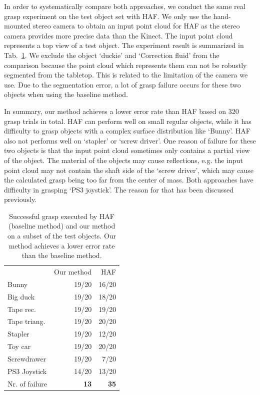 In order to systematically compare both approaches, we conduct the same real grasp experiment on the test object set with HAF. We only use the hand-mounted stereo camera to obtain an input point cloud for HAF as the stereo camera provides more precise data than the Kinect. The input point cloud represents a top view of a test object. The experiment result is summarized in Tab.~\ref{tab:baseline_compare}. 
We exclude the object `duckie' and `Correction fluid' from the comparison because the point cloud which represents them can not be robustly segmented from the tabletop. This is related to the limitation of the camera we use. Due to the segmentation error, a lot of grasp failure occurs for these two objects when using the baseline method. 

In summary, our method achieves a lower error rate than HAF based on 320 grasp trials in total. HAF can perform well on small regular objects, while it has difficulty to grasp objects with a complex surface distribution like `Bunny'. HAF also not performs well on `stapler' or `screw driver'. One reason of failure for these two objects is that the input point cloud sometimes only contains a partial view of the object. The material of the objects may cause reflections, e.g. the input point cloud may not contain the shaft side of the `screw driver', which may cause the calculated grasp being too far from the center of mass. Both approaches have difficulty in grasping `PS3 joystick'. The reason for that has been discussed previously.
\begin{table}[!htb]
\centering
\begin{tabular}{lrr}
               & Our method & HAF   \\
Bunny          & 19/20      & 16/20 \\
Big duck       & 19/20      & 18/20 \\
Tape rec.      & 19/20      & 19/20 \\
Tape triang.   & 19/20      & 20/20 \\
Stapler        & 19/20      & 12/20 \\
Toy car        & 19/20      & 20/20 \\
Screwdrawer    & 19/20      & 7/20  \\
PS3 Joystick   & 14/20      & 13/20 \\
Nr. of failure & \textbf{13}         & \textbf{35}   
\end{tabular}
\caption{Successful grasp executed by HAF (baseline method) and our method on a subset of the test objects. Our method achieves a lower error rate than the baseline method.}
\label{tab:baseline_compare}
\end{table}


